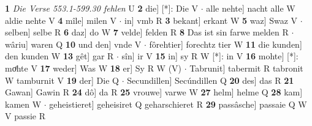 \documentclass[8pt,a4paper,notitlepage]{article}
\begin{document}
\begin{table}[ht]
\begin{minipage}[t]{0.5\linewidth}
\textbf{1} \textit{Die Verse 553.1-599.30 fehlen} U  \textbf{2} die] [*]: Die V  $\cdot$ alle nehte] nacht alle W aldie nehte V \textbf{4} mîle] milen V  $\cdot$ in] vmb R \textbf{3} bekant] erkant W \textbf{5} waz] Swaz V  $\cdot$ selben] selbe R \textbf{6} daz] do W \textbf{7} velde] felden R \textbf{8} Das ist sin farwe melden R  $\cdot$ wâriu] waren Q \textbf{10} und den] vnde V  $\cdot$ fôrehtier] forechtz tier W \textbf{11} die kunden] den kunden W \textbf{13} gêt] gar R  $\cdot$ sîn] ir V \textbf{15} in] sy R W [*]: in V \textbf{16} mohte] [*]: moͤhte V \textbf{17} weder] Was W \textbf{18} er] Sy R W (V)  $\cdot$ Tabrunit] tabermit R tabronit W tamburnit V \textbf{19} der] Die Q  $\cdot$ Secundillen] Secúndillen Q \textbf{20} des] das R \textbf{21} Gawan] Gawin R \textbf{24} dô] da R \textbf{25} vrouwe] varwe W \textbf{27} helm] helme Q \textbf{28} kam] kamen W  $\cdot$ geheistieret] geheisiret Q geharschieret R \textbf{29} passâsche] passaie Q W V passie R \newline
\end{minipage}
\end{table}
\end{document}
